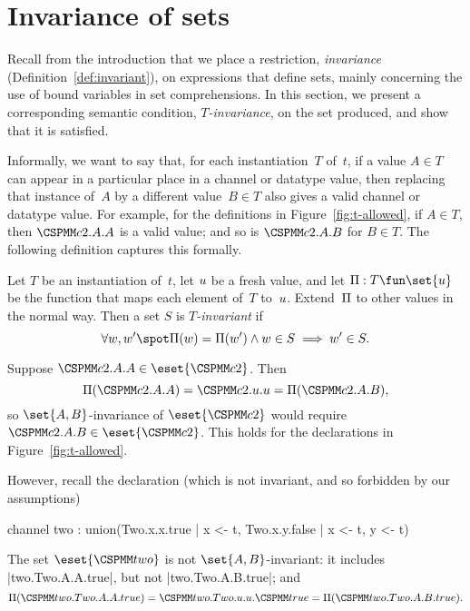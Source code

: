 \section{Invariance of sets}

Recall from the introduction that we place a restriction, \emph{invariance}
(Definition~\ref{def:invariant}), on expressions that define sets, mainly
concerning the use of bound variables in set comprehensions.  In this section,
we present a corresponding semantic condition, \emph{$T$-invariance}, on the
set produced, and show that it is satisfied. 

Informally, we want to say that, for each instantiation~$T$ of~$t$, if a value
$A \in T$ can appear in a particular place in a channel or datatype value,
then replacing that instance of~$A$ by a different value~$B \in T$ also gives
a valid channel or datatype value.  For example, for the definitions in
Figure~\ref{fig:t-allowed}, if $A \in T$, then $\M{c2}.A.A$ is a valid value;
and so is $\M{c2}.A.B$ for $B \in T$.  The following definition captures this
formally.
%
\begin{definition}
Let $T$ be an instantiation of~$t$, let $u$ be a fresh value, and let
$\unitf : T \fun \set{\unit}$ be the function that maps each element of~$T$
to~$u$. Extend~$\Pi$ to other values in the normal way.  Then a set $S$
is \emph{$T$-invariant} if
\[
\forall w, w' \spot
  \unitf(w) = \unitf(w') \land w \in S  \implies w' \in S.
\]
\end{definition}


\begin{example}
Suppose $\M{c2}.A.A \in \eset{\M{c2}}$.  Then 
\[
\unitf(\M{c2}.A.A) = \M{c2}.\unit.\unit = \unitf(\M{c2}.A.B),
\]
so $\set{A,B}$-invariance of $\eset{\M{c2}}$ would require $\M{c2}.A.B \in
\eset{\M{c2}}$.  This holds for the declarations in
Figure~\ref{fig:t-allowed}.

However, recall the declaration (which is not invariant, and so forbidden by
our assumptions)
%
\begin{cspm}
channel two : union({Two.x.x.true | x <- t}, {Two.x.y.false | x <- t, y <- t})
\end{cspm}
%
The set $\eset{\M{two}}$ is not $\set{A,B}$-invariant: it includes
|two.Two.A.A.true|, but not |two.Two.A.B.true|; and
\[
\unitf(\M{two.Two.A.A.true}) = \M{two.Two}.u.u.\M{true} =
   \unitf(\M{two.Two.A.B.true}).
\]
\end{example}



